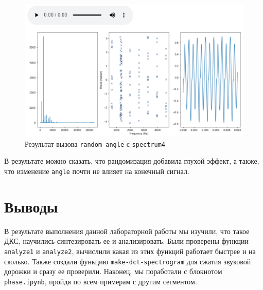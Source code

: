 \documentclass[a4paper]{article}
\begin{document}
            \begin{figure}[H]
                \centering
                \includegraphics[width=\textwidth]{ex_3_spectrum4.png}
                \caption{Результат вызова \texttt{random-angle} с \texttt{spectrum4}}
                \label{fig:ex_3_spectrum4}
            \end{figure}
            
            В результате можно сказать, что рандомизация добавила глухой эффект, а также, что изменение \texttt{angle} почти не влияет на конечный сигнал.
            
    \newpage
        \section{Выводы}
             В результате выполнения данной лабораторной работы мы изучили, что такое ДКС, научились синтезировать ее и анализировать. Были проверены функции \texttt{analyze1} и \texttt{analyze2}, вычислили какая из этих функций работает быстрее и на сколько. Также создали функцию \texttt{make-dct-spectrogram} для сжатия звуковой дорожки и сразу ее проверили. Наконец, мы поработали с блокнотом \texttt{phase.ipynb}, пройдя по всем примерам с другим сегментом.
            
            
            
\end{document}
